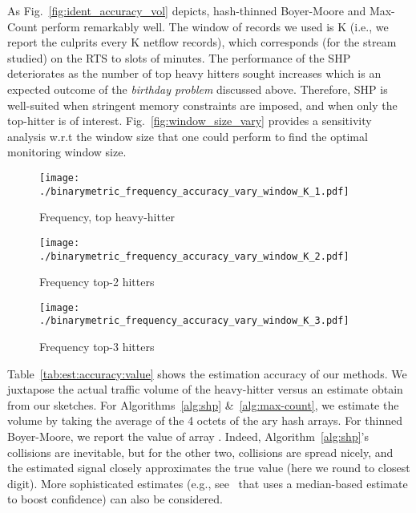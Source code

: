 \documentclass[10pt, conference, letterpaper,onecolumn]{IEEEtranv1.8}
\theoremstyle{plain}\newtheorem{thm}{Theorem}\newtheorem{lem}{Lemma}
\theoremstyle{definition}
\begin{document}
As Fig.~\ref{fig:ident_accuracy_vol} depicts, hash-thinned Boyer-Moore  and Max-Count perform remarkably well. 
The window of records we used is K (i.e., we report the culprits every K netflow records), which corresponds (for the stream studied)
on the RTS to slots of  minutes. The performance of the SHP
deteriorates as the number  of top heavy hitters sought increases
which is an expected outcome of the \emph{birthday problem} discussed above.
Therefore, SHP is well-suited when stringent memory constraints are imposed,
and when only the top-hitter is of interest.
Fig.~\ref{fig:window_size_vary} provides a sensitivity analysis w.r.t the window size
that  one could perform to find the optimal monitoring window size.







\begin{figure*}
        \vspace{-12pt}
        \centering
        \begin{subfigure}[b]{0.3\textwidth}
                \texttt{[image: ./binarymetric\_frequency\_accuracy\_vary\_window\_K\_1.pdf]}
                \caption{\footnotesize Frequency, top heavy-hitter}
                \label{fig:win:1}
        \end{subfigure}
        \begin{subfigure}[b]{0.3\textwidth}
                \texttt{[image: ./binarymetric\_frequency\_accuracy\_vary\_window\_K\_2.pdf]}
                \caption{\footnotesize Frequency top-2 hitters}
                \label{fig:win:2}
        \end{subfigure}       
        \begin{subfigure}[b]{0.3\textwidth}
                \texttt{[image: ./binarymetric\_frequency\_accuracy\_vary\_window\_K\_3.pdf]}
                \caption{\footnotesize Frequency top-3 hitters}
                \label{fig:win:3}
        \end{subfigure}
        \caption{\footnotesize Identification accuracy (using the \emph{exact} criterion)  with varying window.}
        \label{fig:window_size_vary}
\end{figure*}

Table~\ref{tab:est:accuracy:value} shows the estimation accuracy of our methods. 
We juxtapose the actual traffic volume of the heavy-hitter versus an estimate obtain from our sketches.
For Algorithms~\ref{alg:shp} \&~\ref{alg:max-count},   we estimate 
the volume by taking the average of the 4 octets
of the ary hash arrays. For thinned Boyer-Moore,
we report the value of array . Indeed,  Algorithm~\ref{alg:shp}'s 
collisions are inevitable, but for the other two, collisions are spread nicely, and
the estimated signal closely approximates  the true value (here we round to closest digit). More sophisticated estimates  (e.g., see~\cite{Krishnamurthy:2003:SCD:948205.948236} that uses a median-based estimate
to boost confidence) can also be considered.
\end{document}
